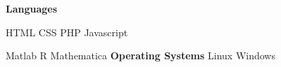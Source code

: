 \begin{multicols}{3}
[
]
\textbf{Languages} \newline
{} \newline
{} \newline
{} \newline
{} \newline \linebreak
{} \newline
{} \newline
{}

\columnbreak
{} \newline
HTML \newline
CSS\newline
PHP\newline
Javascript \newline \linebreak 
{} \newline
{} \newline


\columnbreak
{} \newline
Matlab \newline
R \newline
Mathematica \linebreak \linebreak \newline
\textbf{Operating Systems} \newline
Linux \newline
Windows
\end{multicols}